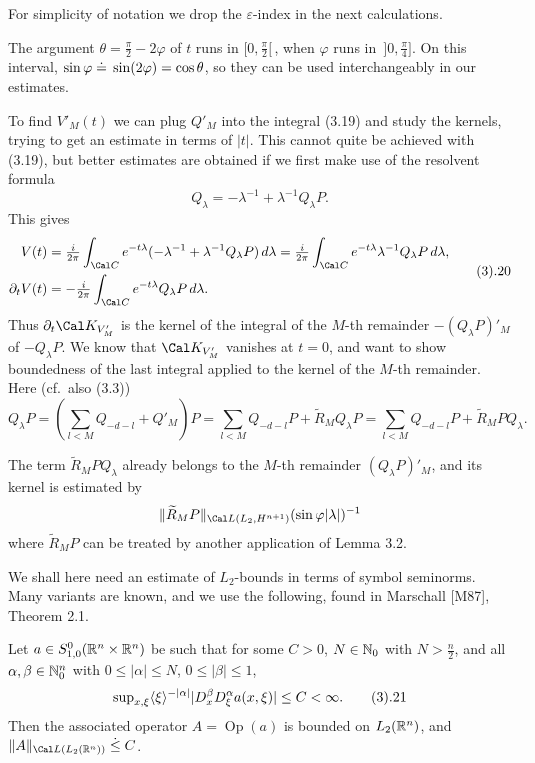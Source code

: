 For simplicity of notation we drop the $\varepsilon $-index in the
next calculations.

 The argument $\theta =\frac\pi 2-2\varphi $ of
$t$ runs in $[0,\frac\pi  2[\,$, when $\varphi $ runs in
$\,]0,\frac\pi 4]$. On this interval, $\sin\varphi \;\dot {=}\; \sin(2\varphi
)=\cos\theta $, so they can be used interchangeably in our estimates.
\endexample

To find ${V'_M}(t)$ we can plug $Q'_M$ into the integral (3.19)  and study
the kernels, trying to get an estimate in terms of $|t|$. This cannot
quite be achieved with (3.19), but better estimates
are obtained if we first make use of the resolvent formula
$$
Q_\lambda = -\lambda ^{-1}+\lambda ^{-1}Q_\lambda P.
$$
This gives
$$
\aligned
V(t)&=\tfrac i {2\pi }\int_{\Cal C}e^{-t\lambda }(-\lambda
^{-1}+\lambda ^{-1}Q _\lambda P)\,d\lambda =\tfrac i {2\pi }\int_{\Cal
C}e^{-t\lambda }\lambda ^{-1}Q _\lambda P\,d\lambda,\\
\partial_tV(t)&=-\tfrac i {2\pi }\int_{\Cal C}e^{-t\lambda }Q _\lambda P\,d\lambda.
\endaligned\tag3.20
$$
Thus $\partial_t\Cal K_{V'_M}$ is the kernel of the integral of the  $M$-th
remainder $-(Q_\lambda P)'_M$ of $-Q _\lambda P$. We know that $\Cal K_{V'_M}$
vanishes at $t=0$, and want to show boundedness of the last integral
applied to the kernel of the $M$-th remainder.
Here (cf.\ also (3.3))
$$
Q_\lambda P=({\sum_{l<M}}Q_{-d-l}+Q'_M)P=
{\sum}_{l<M}Q_{-d-l}P+ \widetilde R_MQ _\lambda P={\sum}_{l<M}Q_{-d-l}P+ \widetilde R_MPQ _\lambda .
$$

The term $\widetilde R_MPQ _\lambda $ already belongs to the $M$-th
remainder $(Q_\lambda P)'_M$, and its kernel
is estimated by
$$
\|\widetilde R_MP\|_{\Cal L(L_2,H^{n+1})}(\sin\varphi |\lambda |)^{-1}
$$
where $\widetilde R_M P$ can be treated by another application of
Lemma 3.2.

We shall here need an estimate of
$L_2$-bounds in terms of symbol seminorms. Many variants are known,
and we use the following, found in Marschall [M87], Theorem 2.1.


Let $a \in S^0_{1,0}(\Bbb R^n \times \Bbb R^n)$ be such that for some
$C>0$, $N \in {\Bbb N}_{0}$ with $N>\frac{n}{2}$, and all $\alpha, \beta
\in {\Bbb N}_{0}^n$ with $0 \leq |\alpha|
\leq N$, $0 \leq |\beta|\leq 1$,
$$
\operatorname{sup}_{x,\xi } \ang{\xi}^{-|\alpha|} |D_x^\beta D_\xi^\alpha
a(x, \xi)| \leq C <
\infty .\tag3.21
$$
Then the associated operator $A = \operatorname{Op}(a)$ is bounded on
$L_2(\Bbb R^n)$, and $\|A\|_{{\Cal L}(L_2(\Bbb R^n))} \leg C$.
\endproclaim

